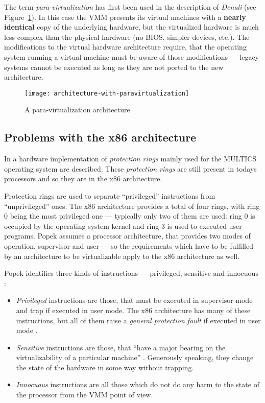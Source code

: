 The term \emph{para-virtualization} has first been used in the description
of  \emph{Denali}  \cite{denali}  (see Figure~\ref{fig:arch-para-virt}).  In
this  case the  VMM presents  its virtual  machines with  a \textbf{nearly
  identical} copy of the underlying hardware, but the virtualized hardware
is much less complex than the physical hardware (no BIOS, simpler devices,
etc.).  The  modifications to  the virtual hardware  architecture require,
that the operating system running a virtual machine must be aware of those
modifications --- legacy  systems cannot be executed as  long as they are
not ported to the new architecture.

\begin{figure}[htbp]
  \centering
  \texttt{[image: architecture-with-paravirtualization]}
  \caption{A para-virtualization architecture}
  \label{fig:arch-para-virt}
\end{figure}

\subsection{Problems with the x86 architecture}
\label{sec:x86-problems}

In \cite{schroeder72} a hardware implementation of \emph{protection rings}
mainly  used  for  the  MULTICS  operating system  are  described.   These
\emph{protection rings} are still present in todays processors and so they
are in the x86 architecture.

Protection  rings are  used to  separate ``privileged''  instructions from
``unprivileged''  ones. The  x86  architecture provides  a  total of  four
rings, with ring 0 being the most privileged one --- typically only two of
them are used: ring 0 is  occupied by the operating system kernel and ring
3  is used  to executed  user  programs.  Popek  \cite{popek74} assumes  a
processor architecture,  that provides two modes  of operation, supervisor
and  user  --- so  the  requirements  which have  to  be  fulfilled by  an
architecture to be virtualizable apply to the x86 architecture as well.

Popek identifies three kinds of instructions --- privileged, sensitive and
innocuous \cite{popek74}:

\begin{itemize}
\item \emph{Privileged}  instructions are those, that must  be executed in
  supervisor mode and trap if  executed in user mode. The x86 architecture
  has many  of these instructions, but  all of them  raise a \emph{general
    protection fault} if executed in user mode \cite{robin00analysis}.
  
\item \emph{Sensitive} instructions are those, that ``have a major bearing
  on     the     virtualizability     of    a     particular     machine''
  \cite{popek74}.  Generously  speaking,  they  change the  state  of  the
  hardware in some way without trapping.
  
\item \emph{Innocuous} instructions are all those which do not do any harm
  to the state of the processor from the VMM point of view.
\end{itemize}

